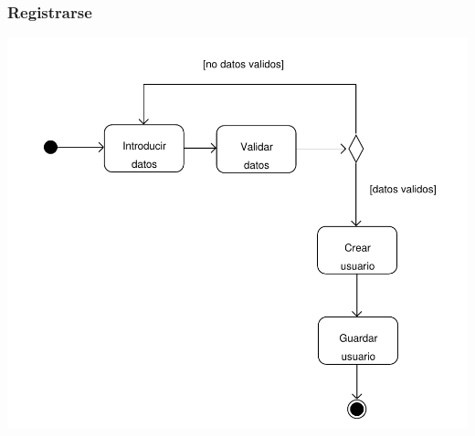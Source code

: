 \documentclass[11pt, a4paper, twoside, titlepage]{article}
\begin{document}
			\subsubsection{Registrarse}
				\begin{center}
					\includegraphics[scale=.8]{analisis/diagramas/da_registrarse.pdf}
				\end{center}
\end{document}
